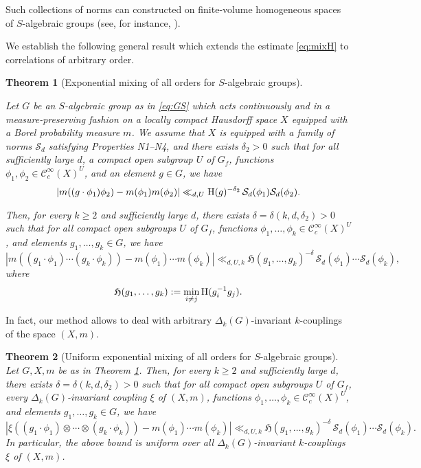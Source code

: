 \documentclass[11pt,reqno,a4paper]{amsart}
\numberwithin{equation}{section}
\newcommand{\cC}{\mathcal{C}}
\newcommand{\cS}{\mathcal{S}}
\theoremstyle{theorem}
\newtheorem{theorem}{Theorem}[section]
\theoremstyle{definition}
\begin{document}
Such collections of norms can constructed on finite-volume homogeneous spaces
of $S$-algebraic groups (see, for instance, \cite[Appendix~A]{EMMV}).

We establish the following general result which extends the estimate \eqref{eq:mixH} to correlations of arbitrary order.

\begin{theorem}[Exponential mixing of all orders for $S$-algebraic groups]
	\label{main1_Sarithmetic}
	
Let $G$ be an $S$-algebraic group as in \eqref{eq:GS}
which acts continuously and in a measure-preserving fashion on
a locally compact Hausdorff space $X$ equipped with a Borel probability measure $m$. We assume 
that $X$ is equipped with a family of norms $\cS_d$ satisfying Properties {\rm N1--N4},
and  
there exists $\delta_2>0$
such that for all sufficiently large $d$, a compact open subgroup $U$ of $G_f$, 
functions $\phi_1,\phi_2\in\cC_c^\infty(X)^U$, and an element $g\in G$, we have 
$$
|m((g\cdot \phi_1)\phi_2) -m(\phi_1)m(\phi_2)|\ll_{d,U} \hbox{\rm H}(g)^{-\delta_2}\, \cS_d(\phi_1)\cS_d(\phi_2).
$$
	
Then, for every $k \geq 2$ and sufficiently large $d$, there exists $\delta=\delta(k,d, \delta_2) > 0$
such that for all compact open subgroups $U$ of $G_f$,
functions $\phi_1,\ldots,\phi_k \in\cC_c^\infty(X)^U$, and elements $g_1,\ldots,g_k \in G$, we have 
	\[
	| m((g_1 \cdot \phi_1) \cdots (g_k \cdot \phi_k)) - m(\phi_1) \cdots m(\phi_k) |
	\ll_{d,U,k}
	\mathfrak{H}(g_1,\ldots,g_k)^{-\delta} \, \cS_d(\phi_1) \cdots \cS_d(\phi_k),
	\]
	where 
	$$
	\mathfrak{H}(g_1,\ldots,g_k):=\min_{i\ne j} \hbox{\rm H}(g_i^{-1} g_j).
	$$
\end{theorem}


In fact, our method allows to deal with arbitrary 
$\Delta_{k}(G)$-invariant $k$-couplings of the space $(X,m)$.

\begin{theorem}[Uniform exponential mixing of all orders for $S$-algebraic groups]
	\label{main1_coupl_Sarithmetic}
	Let $G, X, m$ be as in Theorem \ref{main1_Sarithmetic}. Then, for every $k \geq 2$
	and sufficiently large $d$, there exists $\delta=\delta(k,d,\delta_2)>0$ such that for all compact open subgroups $U$ of $G_f$, every $\Delta_{k}(G)$-invariant coupling $\xi$ of $(X,m)$,
	functions $\phi_1,\ldots,\phi_k \in\cC_c^\infty(X)^U$,
	and elements $g_1,\ldots,g_k \in G$, we have
		\[
		| \xi((g_1 \cdot \phi_1)\otimes \cdots \otimes(g_k \cdot \phi_k)) - m(\phi_1) \cdots m(\phi_k) |
		\ll_{d,U,k}
		\mathfrak{H}(g_1,\ldots,g_k)^{-\delta} \, \cS_d(\phi_1) \cdots \cS_d(\phi_k).
		\]
	In particular, the above bound is uniform over all $\Delta_{k}(G)$-invariant $k$-couplings $\xi$ of $(X,m)$.
\end{theorem}
\end{document}
